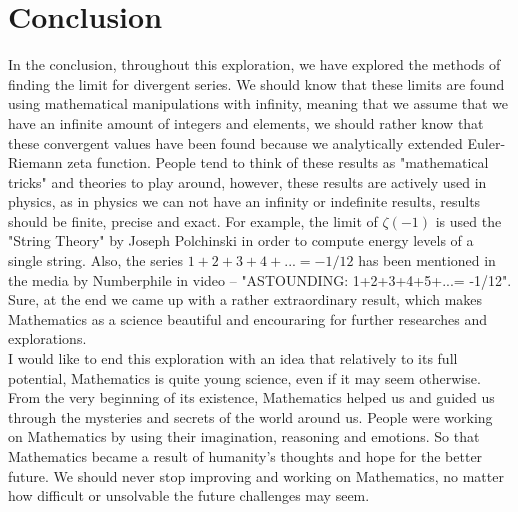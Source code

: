 \documentclass[a4paper]{article}
\begin{document}
\section{Conclusion}

In the conclusion, throughout this exploration, we have explored the methods of finding the limit
for divergent series. We should know that these limits are found using mathematical manipulations
with infinity, meaning that we assume that we have an infinite amount of integers and elements,
we should rather know that these convergent values have been found because we analytically
extended Euler-Riemann zeta function. People tend to think of these results as "mathematical
tricks" and theories to play around, however, these results are actively used in physics, as in physics we
can not have an infinity or indefinite results, results should be finite, precise and exact.
For example,
the limit of $\zeta(-1)$ is used the "String Theory" by Joseph Polchinski\cite{String} in order to compute energy
levels of a single string. Also, the series $1+2+3+4+...=-1/12$ has been mentioned in the media
by Numberphile in video – "ASTOUNDING: 1+2+3+4+5+...= -1/12".\cite{Numberphile} Sure, at the end we came
up with a rather extraordinary result, which makes Mathematics as a science beautiful and
encouraring for further researches and explorations.\\
I would like to end this exploration with an idea that relatively to its full potential, Mathematics is
quite young science, even if it may seem otherwise. From the very beginning of its existence, Mathematics
helped us and guided us through the mysteries and secrets of the world around us. People were working on
Mathematics by using their imagination, reasoning and emotions. So that Mathematics became a result
of humanity's thoughts and hope for the better future. We should never stop improving and working on
Mathematics, no matter how difficult or unsolvable the future challenges may seem.



\end{document}
